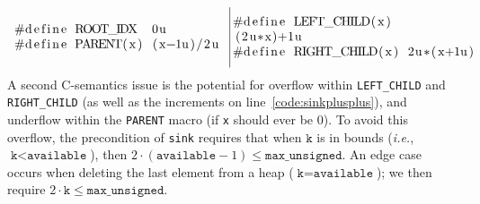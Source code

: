 \[
\begin{array}{@{}l@{~~}|@{~}l@{}}
\begin{minipage}{0.475\textwidth}
\begin{lstlisting}
#define ROOT_IDX  0u
#define PARENT(x) (x-1u)/2u
\end{lstlisting} \end{minipage} &
\begin{minipage}{0.5\textwidth}
\lstset{firstnumber=3}
\begin{lstlisting}
#define LEFT_CHILD(x)  (2u*x)+1u
#define RIGHT_CHILD(x) 2u*(x+1u)
\end{lstlisting}
\end{minipage}
\end{array}
\]
A second C-semantics issue is the potential for overflow within \texttt{LEFT\_CHILD} and \texttt{RIGHT\_CHILD} (as well as the increments on line~\ref{code:sinkplusplus}), and underflow within the \texttt{PARENT} macro (if \texttt{x} should ever be 0).  To avoid this overflow, the precondition of \texttt{sink} requires that when $\texttt{k}$ is in bounds (\emph{i.e.}, $\texttt{k} < \texttt{available}$), then $2\cdot(\texttt{available}-1) \leq \texttt{max\_unsigned}$.  An edge case occurs when deleting the last element from a heap ($\texttt{k}=\texttt{available}$); we then require $2\cdot\texttt{k}\leq \texttt{max\_unsigned}$.

\lstset{style=CoqStyle}

